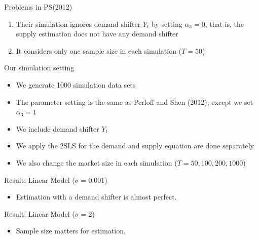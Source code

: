 \documentclass[aspectratio = 169]{beamer}
\theoremstyle{definition}
\begin{document}
\begin{frame}{Problems in PS(2012)}
    \begin{enumerate}
        \item Their simulation ignores demand shifter $Y_t$ by setting $\alpha_3 = 0$, that is, the supply estimation does not have any demand shifter
        \item It considers only one sample size in each simulation ($T = 50$) 
    \end{enumerate}
\end{frame}

\begin{frame}{Our simulation setting}
    \begin{itemize}
        \item We generate 1000 simulation data sets
        \item The parameter setting is the same as Perloff and Shen (2012), except we set $\alpha_3 = 1$
        \item We include demand shifter $Y_t$
        \item We apply the 2SLS for the demand and supply equation are done separately
        \item We also change the market size in each simulation ($T = 50, 100, 200, 1000$)
    \end{itemize}
\end{frame}

\begin{frame}{Result: Linear Model ($\sigma = 0.001$)}
    \begin{table}[]
        \centering
        \tiny
        \label{tab:linear_with_demand_001}
    \end{table}
    \begin{itemize}
        \item Estimation with a demand shifter is almost perfect.
    \end{itemize}
\end{frame}

\begin{frame}{Result: Linear Model ($\sigma = 2$)}
    \begin{table}[]
        \centering
        \tiny
        \label{tab:linear_with_demand_2}
    \end{table}
    \begin{itemize}
        \item Sample size matters for estimation.
    \end{itemize}
\end{frame}
\end{document}
